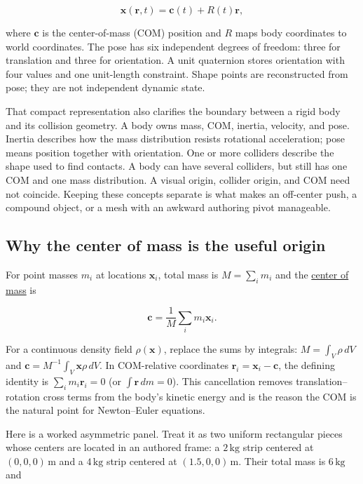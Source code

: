 \[
\mathbf x(\mathbf r,t)=\mathbf c(t)+R(t)\mathbf r,
\]

where \(\mathbf c\) is the center-of-mass (COM) position and \(R\) maps body coordinates to world coordinates. The pose has six independent degrees of freedom: three for translation and three for orientation. A unit quaternion stores orientation with four values and one unit-length constraint. Shape points are reconstructed from pose; they are not independent dynamic state.

That compact representation also clarifies the boundary between a rigid body and its collision geometry. A body owns mass, COM, inertia, velocity, and pose. Inertia describes how the mass distribution resists rotational acceleration; pose means position together with orientation. One or more colliders describe the shape used to find contacts. A body can have several colliders, but still has one COM and one mass distribution. A visual origin, collider origin, and COM need not coincide. Keeping these concepts separate is what makes an off-center push, a compound object, or a mesh with an awkward authoring pivot manageable.


\subsection{Why the center of mass is the useful origin}\label{06-engine-ii-ch034-why-the-center-of-mass-is-the-useful-origin}

\hypertarget{06-engine-ii-ch034-why-the-center-of-mass-is-the-useful-origin}{}

For point masses \(m_i\) at locations \(\mathbf x_i\), total mass is \(M=\sum_i m_i\) and the \hyperref[appendix-66742099f8a0]{center of mass} is

\[
\mathbf c=\frac{1}{M}\sum_i m_i\mathbf x_i.
\]

For a continuous density field \(\rho(\mathbf x)\), replace the sums by integrals: \(M=\int_V\rho\,dV\) and \(\mathbf c=M^{-1}\int_V\mathbf x\rho\,dV\). In COM-relative coordinates \(\mathbf r_i=\mathbf x_i-\mathbf c\), the defining identity is \(\sum_i m_i\mathbf r_i=0\) (or \(\int\mathbf r\,dm=0\)). This cancellation removes translation--rotation cross terms from the body's kinetic energy and is the reason the COM is the natural point for Newton--Euler equations.

Here is a worked asymmetric panel. Treat it as two uniform rectangular pieces whose centers are located in an authored frame: a \(2\,\mathrm{kg}\) strip centered at \((0,0,0)\,\mathrm m\) and a \(4\,\mathrm{kg}\) strip centered at \((1.5,0,0)\,\mathrm m\). Their total mass is \(6\,\mathrm{kg}\) and

